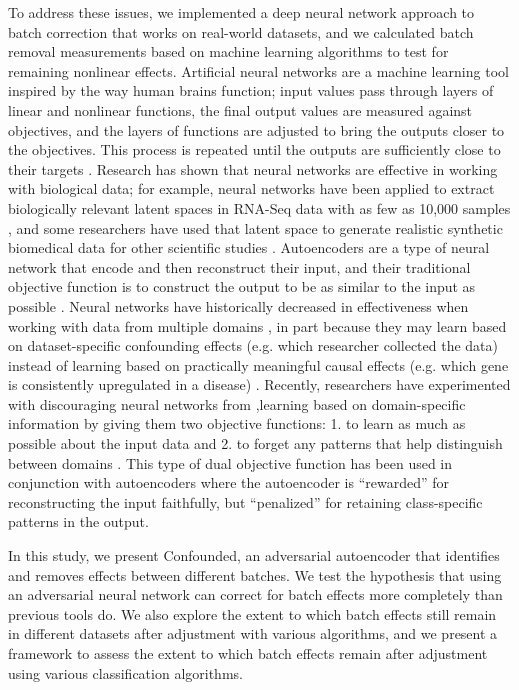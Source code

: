 \documentclass[notitlepage]{article}
\begin{document}
To address these issues, we implemented a deep neural network approach to batch correction that works on real-world datasets, and we calculated batch removal measurements based on machine learning algorithms to test for remaining nonlinear effects.
Artificial neural networks are a machine learning tool inspired by the way human brains function; input values pass through layers of linear and nonlinear functions, the final output values are measured against objectives, and the layers of functions are adjusted to bring the outputs closer to the objectives.
This process is repeated until the outputs are sufficiently close to their targets \citep{schmidhuber_deep_2015}.
Research has shown that neural networks are effective in working with biological data; for example, neural networks have been applied to extract biologically relevant latent spaces in RNA-Seq data with as few as 10,000 samples \citep{way_extracting_2017}, and some researchers have used that latent space to generate realistic synthetic biomedical data for other scientific studies \citep{beaulieu-jones_privacy-preserving_2017}.
Autoencoders are a type of neural network that encode and then reconstruct their input, and their traditional objective function is to construct the output to be as similar to the input as possible \citep{hinton_reducing_2006}.
Neural networks have historically decreased in effectiveness when working with data from multiple domains \citep{ganin_domain-adversarial_2015}, in part because they may learn based on dataset-specific confounding effects (e.g. which researcher collected the data) instead of learning based on practically meaningful causal effects (e.g. which gene is consistently upregulated in a disease) \citep{louizos_causal_2017-2}.
Recently, researchers have experimented with discouraging neural networks from ,learning based on domain-specific information by giving them two objective functions:
1. to learn as much as possible about the input data and
2. to forget any patterns that help distinguish between domains \citep{ganin_domain-adversarial_2015,tzeng_deep_2014-2}.
This type of dual objective function has been used in conjunction with autoencoders \citep{louizos_variational_2015} where the autoencoder is ``rewarded'' for reconstructing the input faithfully, but ``penalized'' for retaining class-specific patterns in the output.

In this study, we present Confounded, an adversarial autoencoder that identifies and removes effects between different batches.
We test the hypothesis that using an adversarial neural network can correct for batch effects more completely than previous tools do.
We also explore the extent to which batch effects still remain in different datasets after adjustment with various algorithms, and we present a framework to assess the extent to which batch effects remain after adjustment using various classification algorithms.
\end{document}
